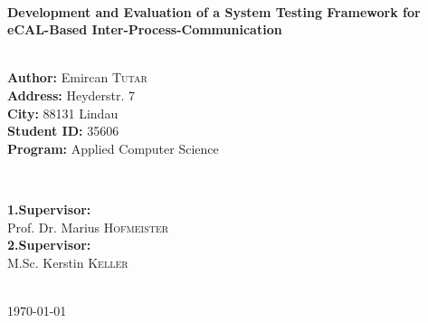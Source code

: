 \documentclass[a4paper,11pt,singlespacing]{article}
\begin{document}
\begin{titlepage}
	
	\HRule \\[0.4cm]
	{ \huge \bfseries Development and Evaluation of a System Testing Framework for eCAL-Based Inter-Process-Communication}\\[0.4cm] %
	\HRule \\[1.5cm]
	
	
	\begin{minipage}{0.5\textwidth}
		\begin{flushleft} \large
			\textbf{Author:} Emircan \textsc{Tutar}\\ %
				\textbf{Address:} Heyderstr. 7\\
				\textbf{City:} 88131 Lindau\\
				\textbf{Student ID:} 35606\\
				\textbf{Program:} Applied Computer Science
		
		\end{flushleft}
	\end{minipage}
	~
	\begin{minipage}{0.45\textwidth}
		\begin{flushleft} \large
			\textbf{1.Supervisor:} \\
			Prof. Dr. Marius \textsc{Hofmeister} \\ %
			\textbf{2.Supervisor:} \\
			M.Sc. Kerstin \textsc{Keller} %
		\end{flushleft}
	\end{minipage}\\[1cm]
	
	
	
	{\large \today}\\[2cm] %
	
	\vfill %
	
\end{titlepage}

\tableofcontents
\pagebreak






\printbibliography[heading=bibintoc]
\end{document}
